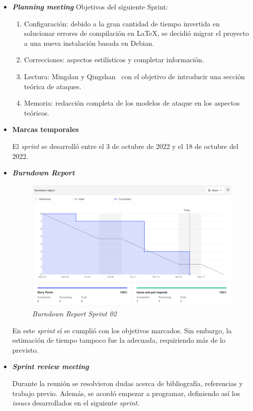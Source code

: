 \begin{itemize}
	\item \textbf{\textit{Planning meeting}}
	Objetivos del siguiente Sprint:
	
	\begin{enumerate}
		\item Configuración: debido a la gran cantidad de tiempo invertida en solucionar errores de compilación en \LaTeX{}, se decidió migrar el proyecto a una nueva instalación basada en Debian.
		\item Correcciones: aspectos estilísticos y completar información.
		\item Lectura: Mingdan y Qingshan~\cite{mingdan2018ShillingAttacksAReview} con el objetivo de introducir una sección teórica de ataques.
		\item Memoria: redacción completa de los modelos de ataque en los aspectos teóricos.
		
	\end{enumerate}
	
	\item \textbf{Marcas temporales}
	
	El \textit{sprint} se desarrolló entre el 3 de octubre de 2022 y el 18 de octubre del 2022.
	
	\item \textbf{\textit{Burndown Report}}
	\begin{figure}[h]
		\caption{\textit{Burndown Report Sprint 02}}
		\centering
		\includegraphics[width=\textwidth]{../img/anexos/bdr/s02_bdr}
	\end{figure}
		
	En este \textit{sprint} sí se cumplió con los objetivos marcados. Sin embargo, la estimación de tiempo tampoco fue la adecuada, requiriendo más de lo previsto.
	
	\item \textbf{\textit{Sprint review meeting}}
	
	Durante la reunión se resolvieron dudas acerca de bibliografía, referencias y trabajo previo. Además, se acordó empezar a programar, definiendo así los \textit{issues} desarrollados en el siguiente \textit{sprint}.
	
\end{itemize}


